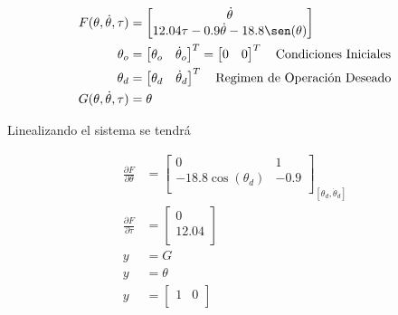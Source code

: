 \documentclass[12pt]{article}
\begin{document}
\begin{equation}
    \begin{split}
        F(\theta,\dot{\theta},\tau)&=\begin{bmatrix}
        \dot{\theta}  \\
        12.04\tau-0.9\dot{\theta}-18.8\sen(\theta) \\ 
        \end{bmatrix}\\
        \theta_o&=\begin{bmatrix} \theta _o & \dot{\theta}_o  \end{bmatrix}^T = \begin{bmatrix} 0&0  \end{bmatrix}^T \quad \text{Condiciones Iniciales}\\
        \theta_d&=\begin{bmatrix} \theta _d& \dot{\theta}_d  \end{bmatrix}^T \quad \text{Regimen de Operación Deseado}\\
        G(\theta,\dot{\theta},\tau)&=\theta
    \end{split}
    \label{eq:linearization}
\end{equation}

Linealizando el sistema se tendrá

\begin{equation}
    \begin{split}
        \frac{\partial F}{\partial \theta}&=\begin{bmatrix}
        0 & 1  \\
        -18.8\cos(\theta_d) & -0.9 \\ 
        \end{bmatrix}_{[\theta _d,\dot{\theta}_d]}\\
        \frac{\partial F}{\partial \tau}&=\begin{bmatrix}
        0 \\
        12.04 \\
        \end{bmatrix}\\
        y&=G\\
        y&=\theta\\
        y&=\begin{bmatrix}
        1 & 0 \\
        \end{bmatrix}
    \end{split}
    \label{eq:linearized}
\end{equation}
\end{document}
